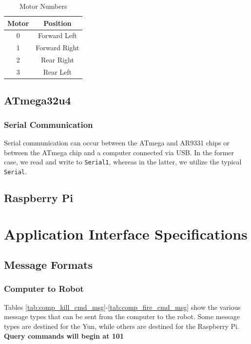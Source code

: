 \documentclass[letterpaper,12pt]{article}
\newcommand{\xxx}[1]{{\color{red}\bf #1}}
\begin{document}
\begin{table}[h!]
  \centering
  \begin{tabular}{| c | c |}
    \hline
    \textbf{Motor} & \textbf{Position} \\
    \hline
    0 & Forward Left \\
    \hline
    1 & Forward Right \\
    \hline
    2 & Rear Right \\
    \hline
    3 & Rear Left \\
    \hline
  \end{tabular}
  \caption{Motor Numbers}
  \label{tab:motor_nums}
\end{table}


\subsection{ATmega32u4}

\subsubsection{Serial Communication}
\label{sec:atmega_serial_com}

\noindent Serial communication can occur between the ATmega and AR9331 chips or between the ATmega chip and a computer connected via USB. In the former case, we read and write to \texttt{Serial1}, whereas in the latter, we utilize the typical \texttt{Serial}.


\subsection{Raspberry Pi}

\section{Application Interface Specifications}

\subsection{Message Formats}

\subsubsection{Computer to Robot}
\label{sec:comp_robot_msg}

\noindent Tables \ref{tab:comp_kill_cmd_msg}-\ref{tab:comp_fire_cmd_msg} show the various message types that can be sent from the computer to the robot. Some message types are destined for the Yun, while others are destined for the Raspberry Pi. \xxx{Query commands will begin at 101}
\end{document}

